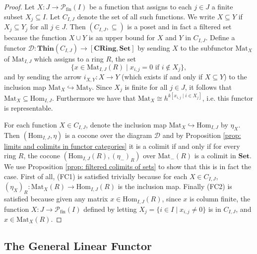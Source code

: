 \documentclass[oneside,11pt]{amsart}
\newcommand{\bSet}{\ensuremath{\textbf{Set}}}
\newcommand{\bCRing}{\ensuremath{\textbf{CRing}}}
\newcommand{\bThin}{\ensuremath{\textbf{Thin}}}
\newcommand{\mD}{\ensuremath{\mathcal{D}}}
\newcommand{\Hom}{\ensuremath{\text{Hom}}}
\newcommand{\Mat}{\ensuremath{\text{Mat}}}
\theoremstyle{definition}
\newtheorem{proof techniques}{Proof Techniques}
\begin{document}
\begin{proof}
Let $X: J \to \mathcal{P}_\text{fin}(I)$ be a function that assigns to each $j \in J$ a finite subset $X_j \subseteq I$.  Let $C_{I , J}$ denote the set of all such functions. We write $X \subseteq Y$ if $X_j \subseteq Y_j$ for all $j \in J$. Then $(C_{I , J} , \subseteq)$ is a poset and in fact a filtered set because the function $X \cup Y$ is an upper bound for $X$ and $Y$ in $C_{I , J} $. Define a functor $\mD : \bThin(C_{I , J} ) \to [\bCRing , \bSet]$ by sending $X$ to the subfunctor $\Mat_{X}$ of $\Mat_{I, J}$ which assigns to a ring $R$, the set 
\begin{equation*}
\{ x \in \Mat_{I , J}(R) \mid x_{i, j} = 0 \text{ if } i \notin X_j \}, 
\end{equation*}
and by sending the arrow $i_{X , Y} : X \to Y$ (which exists if and only if $X \subseteq Y$) to the inclusion map $\Mat_{X} \hookrightarrow \Mat_{Y}$. Since $X_j$ is finite for all $j \in J$, it follows that $\Mat_{X} \subseteq \Hom_{I , J}$. Furthermore we have that $\Mat_{X} \cong h^{k[x_{i,j} \mid i \in X_j ]}$, i.e. this functor is representable. 

For each function $X \in C_{I , J}$, denote the inclusion map $\Mat_{X} \hookrightarrow \Hom_{I , J}$ by $\eta_{X}$. Then $(\Hom_{I , J} , \eta)$ is a cocone over the diagram $\mD$ and by Proposition \ref{prop: limits and colimits in functor categories} it is a colimit if and only if for every ring $R$, the cocone $(\Hom_{I , J}(R) , (\eta_-)_R)$ over $\Mat_-(R)$ is a colimit in $\bSet$. We use Proposition \ref{prop: filtered colimits of sets} to show that this is in fact the case. First of all, (FC1) is satisfied trivially because for each $X \in C_{I , J}$, $(\eta_X)_R : \Mat_X(R) \to \Hom_{I , J}(R)$ is the inclusion map. Finally (FC2) is satisfied because given any matrix $x \in \Hom_{I , J}(R)$, since $x$ is column finite, the function $X : J \to \mathcal{P}_\text{fin}(I)$ defined by letting $X_j = \{ i \in I \mid x_{i,j} \neq 0 \}$ is in $C_{I , J}$, and $x \in \Mat_X(R)$. 
\end{proof}


\subsection{The General Linear Functor} 
\end{document}
